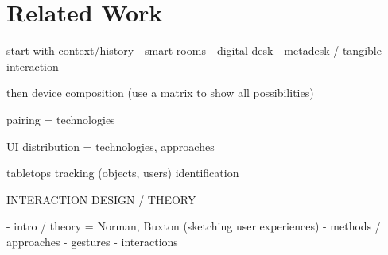 \chapter{Related Work}

start with context/history
- smart rooms
- digital desk
- metadesk / tangible interaction

then device composition (use a matrix to show all possibilities)

pairing = technologies

UI distribution = technologies, approaches

tabletops
tracking (objects, users)
identification

INTERACTION DESIGN / THEORY

- intro / theory = Norman, Buxton (sketching user experiences)
- methods / approaches
- gestures
- interactions
